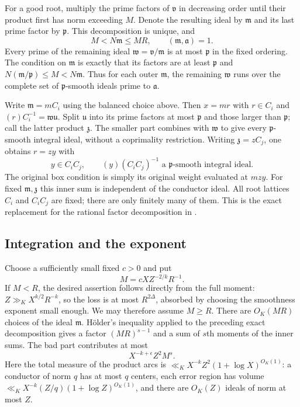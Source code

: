 \documentclass[11pt]{amsart}
\theoremstyle{definition}
\numberwithin{equation}{section}
\begin{document}
For a good root, multiply the prime factors of $\mathfrak v$ in decreasing
order until their product first has norm exceeding $M$.  Denote the
resulting ideal by $\mathfrak m$ and its last prime factor by $\mathfrak p$.
This decomposition is unique, and
\[
 M<N\mathfrak m\le MR,\qquad
 (\mathfrak m,\mathfrak a)=1.
\]
Every prime of the remaining ideal $\mathfrak w=\mathfrak v/\mathfrak m$
is at most $\mathfrak p$ in the fixed ordering.  The condition on
$\mathfrak m$ is exactly that its factors are at least $\mathfrak p$ and
$N(\mathfrak m/\mathfrak p)\le M<N\mathfrak m$.
Thus for each outer $\mathfrak m$, the remaining $\mathfrak w$ runs over
the complete set of $\mathfrak p$-smooth ideals prime to $\mathfrak a$.

Write $\mathfrak m=m C_i$ using the balanced choice above.  Then $x=mr$
with $r\in C_i$ and
$(r)C_i^{-1}=\mathfrak w\mathfrak u$.
Split $\mathfrak u$ into its prime factors at most $\mathfrak p$ and those
larger than $\mathfrak p$; call the latter product $\mathfrak z$.
The smaller part combines with $\mathfrak w$ to give every
$\mathfrak p$-smooth integral ideal, without a coprimality restriction.
Writing $\mathfrak z=z C_j$, one obtains $r=zy$ with
\[
 y\in C_iC_j,
 \qquad (y)(C_iC_j)^{-1}\text{ a }\mathfrak p\text{-smooth integral ideal}.
\]
The original box condition is simply its original weight evaluated at
$mzy$.  For fixed $\mathfrak m,\mathfrak z$ this inner sum is independent
of the conductor ideal.  All root lattices $C_i$ and $C_iC_j$ are fixed;
there are only finitely many of them.  This is the exact replacement for
the rational factor decomposition in \cite[Sections~3--4]{BW2023}.

\subsection{Integration and the exponent}

Choose a sufficiently small fixed $c>0$ and put
\[
                  M=cX Z^{-2/k}R^{-1}.
\]
If $M<R$, the desired assertion follows directly from the full moment:
$Z\gg_K X^{k/2}R^{-k}$, so the loss is at most $R^{2\Delta}$,
absorbed by choosing the smoothness exponent small enough.
We may therefore assume $M\ge R$.
There are $O_K(MR)$ choices of the ideal $\mathfrak m$.
H\"older's inequality applied to the preceding exact decomposition gives
a factor $(MR)^{s-1}$ and a sum of $s$th moments of the inner sums.
The bad part contributes at most
\begin{equation}\label{eq:restricted-bad}
                       X^{-k+\epsilon}Z^2M^s.
\end{equation}
Here the total measure of the product arcs is
$\ll_KX^{-k}Z^2(1+\log X)^{O_K(1)}$: a conductor of norm $q$ has at
most $q$ centers, each error region has volume
$\ll_K X^{-k}(Z/q)(1+\log Z)^{O_K(1)}$, and there are $O_K(Z)$ ideals
of norm at most $Z$.
\end{document}
